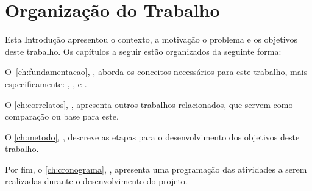 

\section{Organização do Trabalho}\label{sec:organizacao}
Esta Introdução apresentou o contexto, a motivação o problema e os objetivos deste trabalho. Os capítulos a seguir estão organizados da seguinte forma:

O~\autoref{ch:fundamentacao}, \textbf{}, aborda os conceitos necessários para este trabalho, mais especificamente: , ,  e .

O \autoref{ch:correlatos}, \textbf{}, apresenta outros trabalhos relacionados, que servem como comparação ou base para este.

O \autoref{ch:metodo}, \textbf{}, descreve as etapas para o desenvolvimento dos objetivos deste trabalho.

Por fim, o \autoref{ch:cronograma}, \textbf{}, apresenta uma programação das atividades a serem realizadas durante o desenvolvimento do projeto.
